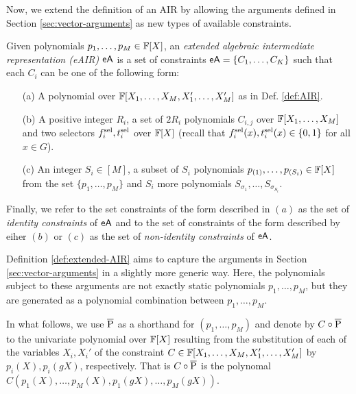 Now, we extend the definition of an AIR by allowing the arguments defined in Section \ref{sec:vector-arguments} as new types of available constraints.
\begin{definition}\label{def:extended-AIR}
  Given polynomials $p_1,\dots,p_M \in \mathbb{F}[X]$, an \textit{extended algebraic intermediate representation (eAIR)} $\textsf{eA}$ is a set of constraints $\textsf{eA} = \{C_1,\dots,C_K\}$ such that each $C_i$ can be one of the following form:
  \begin{enumerate}
    \item[(a)] A polynomial over $\mathbb{F}[X_1,\dots,X_M,X_1',\dots,X_M']$ as in Def. \ref{def:AIR}.
    \item[(b)] A positive integer $R_i$, a set of $2R_i$ polynomials $C_{i,j}$ over $\mathbb{F}[X_1,\dots,X_M]$ and two selectors $f^{\text{sel}}_i,t^{\text{sel}}_i$ over $\mathbb{F}[X]$ (recall that $f^{\text{sel}}_i(x),t^{\text{sel}}_i(x) \in \{0,1\}$ for all $x \in G$).
    \item[(c)] An integer $S_i \in [M]$, a subset of $S_i$ polynomials $p_{(1)},\dots,p_{(S_i)} \in \mathbb{F}[X]$ from the set $\{p_1,\dots,p_M\}$ and $S_i$ more polynomials $S_{\sigma_1},\dots,S_{\sigma_{S_i}}$.
  \end{enumerate}
Finally, we refer to the set constraints of the form described in $(a)$ as the set of \textit{identity constraints} of $\textsf{eA}$ and to the set of constraints of the form described by eiher $(b)$ or $(c)$ as the set of \textit{non-identity constraints} of $\textsf{eA}$.
\end{definition}
Definition \ref{def:extended-AIR} aims to capture the arguments in Section \ref{sec:vector-arguments} in a slightly more generic way. Here, the polynomials subject to these arguments are not exactly static polynomials $p_1,\dots,p_M$, but they are generated as a polynomial combination between $p_1,\dots,p_M$.

In what follows, we use $\overline{\text{P}}$ as a shorthand for $(p_1,\dots,p_M)$ and denote by $C \circ \overline{\text{P}}$ to the univariate polynomial over $\mathbb{F}[X]$ resulting from the substitution of each of the variables $X_i,X_i'$ of the constraint $C \in \mathbb{F}[X_1,\dots,X_M,X_1',\dots,X_M']$ by $p_i(X),p_i(gX)$, respectively. That is $C \circ \overline{\text{P}}$ is the polynomal $C(p_1(X),\dots,p_M(X),p_1(gX),\dots,p_M(gX))$.



